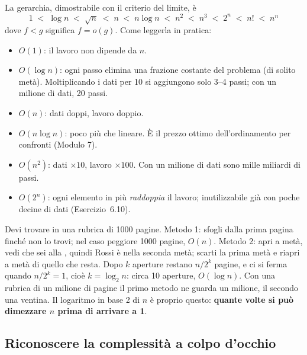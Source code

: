 La gerarchia, dimostrabile con il criterio del limite, è
\[
1 \;<\; \log n \;<\; \sqrt{n} \;<\; n \;<\; n \log n \;<\; n^2 \;<\; n^3 \;<\; 2^n \;<\; n! \;<\; n^n
\]
dove $f < g$ significa $f = o(g)$. Come leggerla in pratica:
\begin{itemize}
  \item $O(1)$: il lavoro non dipende da $n$.
  \item $O(\log n)$: ogni passo elimina una frazione costante del problema (di
        solito metà). Moltiplicando i dati per 10 si aggiungono solo 3--4 passi; con un
        milione di dati, 20 passi.
  \item $O(n)$: dati doppi, lavoro doppio.
  \item $O(n \log n)$: poco più che lineare. È il prezzo ottimo dell'ordinamento per
        confronti (Modulo 7).
  \item $O(n^2)$: dati $\times 10$, lavoro $\times 100$. Con un milione di dati sono
        mille miliardi di passi.
  \item $O(2^n)$: ogni elemento in più \emph{raddoppia} il lavoro; inutilizzabile già
        con poche decine di dati (Esercizio~6.10).
\end{itemize}

\begin{analogia}
Devi trovare  in una rubrica di 1000 pagine. Metodo 1: sfogli dalla prima
pagina finché non lo trovi; nel caso peggiore 1000 pagine, $O(n)$. Metodo 2: apri a
metà, vedi che sei alla , quindi Rossi è nella seconda metà; scarti la prima
metà e riapri a metà di quello che resta. Dopo $k$ aperture restano $n/2^k$ pagine,
e ci si ferma quando $n/2^k = 1$, cioè $k = \log_2 n$: circa 10 aperture,
$O(\log n)$. Con una rubrica di un milione di pagine il primo metodo ne guarda un
milione, il secondo una ventina. Il logaritmo in base 2 di $n$ è proprio questo:
\textbf{quante volte si può dimezzare $n$ prima di arrivare a 1}.
\end{analogia}

\subsection*{Riconoscere la complessità a colpo d'occhio}

